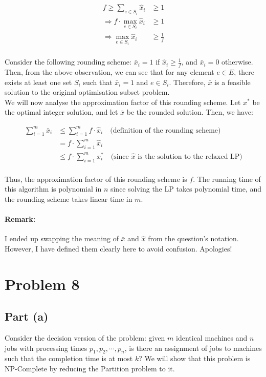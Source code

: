 \documentclass[a4paper]{article}
\begin{document}
\begin{align*}
    f \geq \sum_{e \in S_i} \hat{x}_i & \geq 1 \\
    \Rightarrow f \cdot \max_{e \in S_i} \hat{x}_i & \geq 1 \\
    \Rightarrow \max_{e \in S_i} \hat{x}_i & \geq \frac{1}{f} \\
\end{align*}

\noindent
Consider the following rounding scheme: $\bar{x}_i = 1$ if $\hat{x}_i \geq \frac{1}{f}$, and $\bar{x}_i = 0$ otherwise. Then, from the above observation, we can see that for any element $e \in E$, there exists at least one set $S_i$ such that $\bar{x}_i = 1$ and $e \in S_i$. Therefore, $\bar{x}$ is a feasible solution to the original optimisation subset problem.\\

\noindent
We will now analyse the approximation factor of this rounding scheme. Let $x^*$ be the optimal integer solution, and let $\bar{x}$ be the rounded solution. Then, we have:

\begin{align*}
    \sum_{i=1}^{m} \bar{x}_i & \leq \sum_{i=1}^{m} f \cdot \hat{x}_i \quad \text{(definition of the rounding scheme)} \\
    & = f \cdot \sum_{i=1}^{m} \hat{x}_i \\
    & \leq f \cdot \sum_{i=1}^{m} x^*_i \quad \text{(since $\hat{x}$ is the solution to the relaxed LP)} \\
\end{align*}

\noindent
Thus, the approximation factor of this rounding scheme is $f$. The running time of this algorithm is polynomial in $n$ since solving the LP takes polynomial time, and the rounding scheme takes linear time in $m$.

\paragraph{Remark:} I ended up swapping the meaning of $\bar{x}$ and $\hat{x}$ from the question's notation. However, I have defined them clearly here to avoid confusion. Apologies!


\newpage
\section*{Problem 8}
\subsection*{Part (a)}
Consider the decision version of the problem: given $m$ identical machines and $n$ jobs with processing times $p_1, p_2, \cdots, p_n$, is there an assignment of jobs to machines such that the completion time is at most $k$? We will show that this problem is NP-Complete by reducing the Partition problem to it.\\
\end{document}
